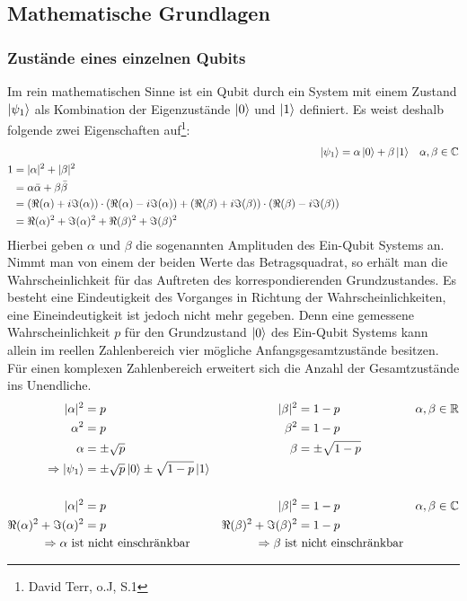 \documentclass[12pt]{report}
\begin{document}

\subsection{Mathematische Grundlagen}					%
\subsubsection{Zustände eines einzelnen Qubits}			%
	Im rein mathematischen Sinne ist ein Qubit durch ein System mit einem Zustand $\ket{\psi_{1}}$ als Kombination der Eigenzustände $\ket{0}$ und $\ket{1}$ definiert. Es weist deshalb folgende zwei Eigenschaften auf\footnote{David Terr, o.J, S.1}:
	\begin{align}
	\ket{\psi_{1}} &= \alpha\ket{0} + \beta\ket{1} & \alpha,\beta \in \mathbb{C}\\
	\begin{split}
		1 &= \vert \alpha \vert^2 + \vert \beta \vert^2 \\
		  &= \alpha\bar{\alpha} + \beta\bar{\beta} \\
		  &= (\Re(\alpha)+i\Im(\alpha))\cdot(\Re(\alpha)-i\Im(\alpha)) + (\Re(\beta)+i\Im(\beta))\cdot(\Re(\beta)-i\Im(\beta)) \\
		  &= \Re(\alpha)^2+\Im(\alpha)^2+\Re(\beta)^2+\Im(\beta)^2
	\end{split}
	\end{align}
	Hierbei geben $\alpha$ und $\beta$ die sogenannten Amplituden des Ein-Qubit Systems an. Nimmt man von einem der beiden Werte das Betragsquadrat, so erhält man die Wahrscheinlichkeit für das Auftreten des korrespondierenden Grundzustandes. Es besteht eine Eindeutigkeit des Vorganges in Richtung der Wahrscheinlichkeiten, eine Eineindeutigkeit ist jedoch nicht mehr gegeben. Denn eine gemessene Wahrscheinlichkeit $p$ für den Grundzustand $\ket{0}$ des Ein-Qubit Systems kann allein im reellen Zahlenbereich vier mögliche Anfangsgesamtzustände besitzen. Für einen komplexen Zahlenbereich erweitert sich die Anzahl der Gesamtzustände ins Unendliche. 
	\begin{align*}
	\vert \alpha \vert^2 &= p & \vert \beta \vert^2 &= 1-p & \alpha,\beta \in \mathbb{R}\\
	\alpha^2 &= p & \beta^2 &= 1-p \\
	\alpha &= \pm\sqrt{p} & \beta &= \pm\sqrt{1-p} \\
	\Rightarrow \ket{\psi_{1}} &= \pm\sqrt{p}\ket{0} \pm\sqrt{1-p}\ket{1}\\\\
	\vert \alpha \vert^2 &= p & \vert \beta \vert^2 &= 1-p & \alpha,\beta \in \mathbb{C}\\
	\Re(\alpha)^2+\Im(\alpha)^2 &= p & \Re(\beta)^2+\Im(\beta)^2 &= 1-p\\
	\Rightarrow \alpha \text{ ist}&\text{ nicht einschränkbar} & \Rightarrow \beta \text{ ist}&\text{ nicht einschränkbar}
	\end{align*}
	
\end{document}

